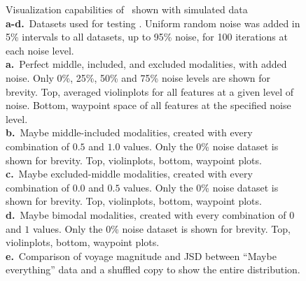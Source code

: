\clearpage
\thispagestyle{facingcaption}
\begin{figure}[h]
\captionsetup{labelformat=prev-page}
\caption[Visualization capabilities of \bonvoyage\, shown with simulated data.]{Visualization capabilities of \bonvoyage\, shown with simulated data\\
\textbf{a-d.}~Datasets used for testing \bonvoyage. Uniform random noise was added in 5\% intervals to all datasets, up to 95\% noise, for 100 iterations at each noise level.\\
\textbf{a.}~Perfect middle, included, and excluded modalities, with added noise. Only 0\%, 25\%, 50\% and 75\% noise levels are shown for brevity. Top, averaged violinplots for all features at a given level of noise. Bottom, waypoint space of all features at the specified noise level.\\
\textbf{b.}~Maybe middle-included modalities, created with every combination of $0.5$ and $1.0$ values. Only the 0\% noise dataset is shown for brevity. Top, violinplots, bottom, waypoint plots.\\
\textbf{c.}~Maybe excluded-middle modalities, created with every combination of $0.0$ and $0.5$ values. Only the 0\% noise dataset is shown for brevity. Top, violinplots, bottom, waypoint plots.\\
\textbf{d.}~Maybe bimodal modalities, created with every combination of $0$ and $1$ values. Only the 0\% noise dataset is shown for brevity. Top, violinplots, bottom, waypoint plots.\\
\textbf{e.}~Comparison of voyage magnitude and JSD between ``Maybe everything'' data and a shuffled copy to show the entire distribution.
}
\label{fig:bonvoyage_simulations}
\end{figure}
\clearpage
